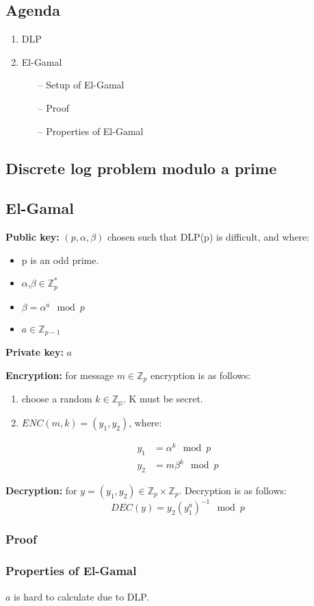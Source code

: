 

\subsection*{Agenda}
\begin{enumerate}
\item DLP
\item El-Gamal
  \begin{itemize}
  \item [--]Setup of El-Gamal
  \item [--]Proof
  \item [--]Properties of El-Gamal
  \end{itemize}
\end{enumerate}


\subsection{Discrete log problem modulo a prime}


\subsection{El-Gamal}
\textbf{Public key:} $(p,\alpha,\beta)$ chosen such that DLP(p) is
difficult, and where:
\begin{itemize}
\item p is an odd prime.
\item $\alpha$,$\beta \in \mathbb{Z}_p^*$
\item $\beta = \alpha^a \mod p$
\item $a \in \mathbb{Z}_{p-1} $
\end{itemize}

\textbf{Private key:} $a$

\textbf{Encryption:} for message $m \in \mathbb{Z}_p$ encryption is as
follows:
\begin{enumerate}
\item choose a random $k \in \mathbb{Z_p}$. K must be secret.
\item $ENC(m,k) = (y_1,y_2)$, where:
\end{enumerate}
\begin{align*}
  y_1 &= \alpha^k \mod p\\
  y_2 &= m\beta^k \mod p
\end{align*}

\textbf{Decryption:} for $y = (y_1,y_2) \in \mathbb{Z}_p \times \mathbb{Z}_p$. Decryption is as follows:
\[DEC(y) = y_2(y_1^a)^{-1} \mod p\]

\subsubsection*{Proof}

\subsubsection*{Properties of El-Gamal}
$a$ is hard to calculate due to DLP.

